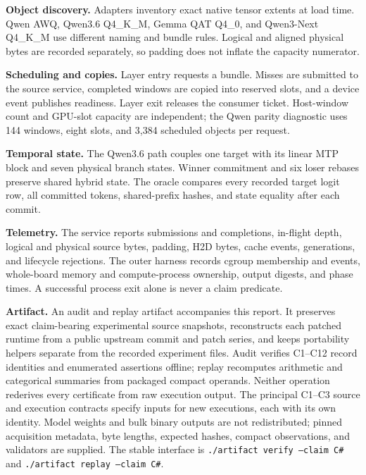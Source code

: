 \documentclass[letterpaper,twocolumn,10pt]{article}
\newcommand{\para}[1]{\smallskip\noindent\textbf{#1.}}
\begin{document}
\para{Object discovery}
Adapters inventory exact native tensor extents at load time.  Qwen AWQ, Qwen3.6
Q4\_K\_M, Gemma QAT Q4\_0, and Qwen3-Next Q4\_K\_M use different naming and
bundle rules.  Logical and aligned physical bytes are recorded separately, so
padding does not inflate the capacity numerator.

\para{Scheduling and copies}
Layer entry requests a bundle.  Misses are submitted to the source service,
completed windows are copied into reserved slots, and a device event publishes
readiness.  Layer exit releases the consumer ticket.  Host-window count and
GPU-slot capacity are independent; the Qwen parity diagnostic uses 144 windows,
eight slots, and 3,384 scheduled objects per request.

\para{Temporal state}
The Qwen3.6 path couples one target with its linear MTP block and seven physical
branch states.  Winner commitment and six loser rebases preserve shared hybrid
state.  The oracle compares every recorded target logit row, all committed
tokens, shared-prefix hashes, and state equality after each commit.

\para{Telemetry}
The service reports submissions and completions, in-flight depth, logical and
physical source bytes, padding, H2D bytes, cache events, generations, and
lifecycle rejections.  The outer harness records cgroup membership and events,
whole-board memory and compute-process ownership, output digests, and phase
times.  A successful process exit alone is never a claim predicate.

\para{Artifact}
An audit and replay artifact accompanies this report.  It preserves exact
claim-bearing experimental source snapshots, reconstructs each patched runtime
from a public upstream commit and patch series, and keeps portability helpers
separate from the recorded experiment files.  Audit verifies C1--C12 record
identities and enumerated assertions offline; replay recomputes arithmetic and
categorical summaries from packaged compact operands.  Neither operation
rederives every certificate from raw execution output.  The principal C1--C3
source and execution contracts specify inputs for new executions, each with its
own identity.  Model weights and bulk binary outputs are not redistributed;
pinned acquisition metadata, byte lengths, expected hashes, compact
observations, and validators are supplied.  The stable interface is
\texttt{./artifact verify --claim C\#} and
\texttt{./artifact replay --claim C\#}.
\end{document}
